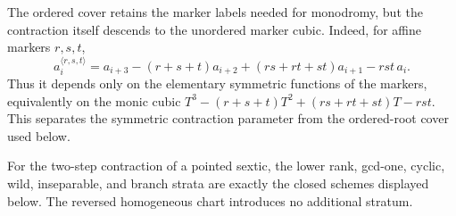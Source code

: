 The ordered cover retains the marker labels needed for monodromy, but
the contraction itself descends to the unordered marker cubic.  Indeed,
for affine markers \(r,s,t\),
\begin{equation}\label{eq:r8-marker-cubic}
 a_i^{\langle r,s,t\rangle}
 =a_{i+3}-(r+s+t)a_{i+2}
 +(rs+rt+st)a_{i+1}-rst\,a_i .
\end{equation}
Thus it depends only on the elementary symmetric functions of the
markers, equivalently on the monic cubic
\(T^3-(r+s+t)T^2+(rs+rt+st)T-rst\).  This separates the symmetric
contraction parameter from the ordered-root cover used below.

\begin{lemma}\label{lem:r8-bottom-strata}%
%
For the two-step contraction of a pointed sextic, the lower rank,
gcd-one, cyclic, wild, inseparable, and branch strata are exactly the
closed schemes displayed below.  The reversed homogeneous chart
introduces no additional stratum.
\end{lemma}

